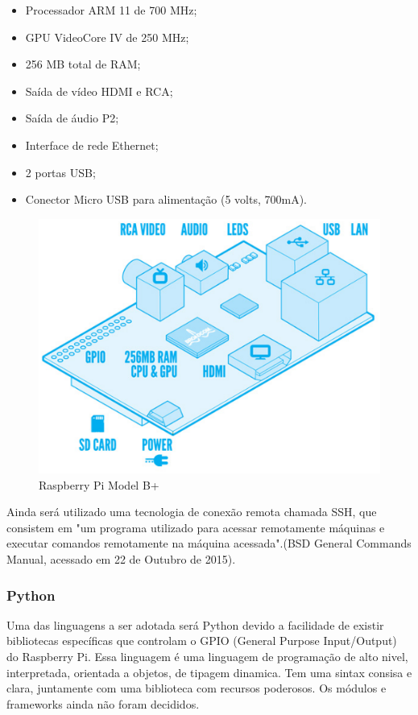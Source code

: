 \begin{itemize}
	\item Processador ARM 11 de 700 MHz;
	\item GPU VideoCore IV de 250 MHz;
	\item 256 MB total de RAM;
	\item Saída de vídeo HDMI e RCA;
	\item Saída de áudio P2;
	\item Interface de rede Ethernet;
	\item 2 portas USB;
	\item Conector Micro USB para alimentação (5 volts, 700mA).
\end{itemize}

\begin{figure}[!htb]
	\centering
	\includegraphics[keepaspectratio=true,scale=0.5]{figuras/referencialteorico/raspberry.eps}
	\caption{Raspberry Pi Model B+}
	\label{rasp}
\end{figure}

Ainda será utilizado uma tecnologia de conexão remota chamada SSH, que consistem em "um programa utilizado para acessar remotamente máquinas e executar comandos remotamente na máquina acessada".(BSD General Commands Manual, acessado em 22 de Outubro de 2015).

\subsubsection{Python}

Uma das linguagens a ser adotada será Python devido a facilidade de existir bibliotecas específicas que controlam o GPIO (General Purpose Input/Output) do Raspberry Pi. Essa linguagem é uma linguagem de programação de alto nivel, interpretada, orientada a objetos, de tipagem dinamica. Tem uma sintax consisa e clara, juntamente com uma biblioteca com recursos poderosos. Os módulos e frameworks ainda não foram decididos.

